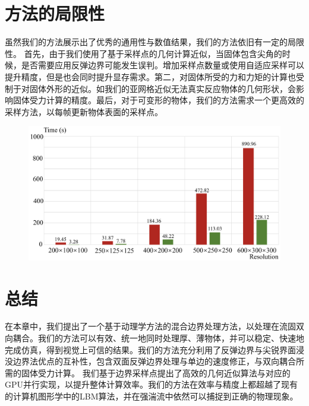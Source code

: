 \section{方法的局限性}
虽然我们的方法展示出了优秀的通用性与数值结果，我们的方法依旧有一定的局限性。
首先，由于我们使用了基于采样点的几何计算近似，当固体包含尖角的时候，是否需要应用反弹边界可能发生误判。增加采样点数量或使用自适应采样可以提升精度，但是也会同时提升显存需求。第二，对固体所受的力和力矩的计算也受制于对固体外形的近似。如我们的亚网格近似无法真实反应物体的几何形状，会影响固体受力计算的精度。最后，对于可变形的物体，我们的方法需求一个更高效的采样方法，以每帧更新物体表面的采样点。

\begin{figure}[!tbp]
  \centering
    \includegraphics[width=0.93\columnwidth]{figures/performance.png}
  \label{img:Performance}
\end{figure}

\section{总结}
在本章中，我们提出了一个基于动理学方法的混合边界处理方法，以处理在流固双向耦合。我们的方法可以有效、统一地同时处理厚、薄物体，并可以稳定、快速地完成仿真，得到视觉上可信的结果。我们的方法充分利用了反弹边界与尖锐界面浸没边界法优点的互补性，包含双面反弹边界处理与单边的速度修正，与双向耦合所需的固体受力计算。
我们基于边界采样点提出了高效的几何近似算法与对应的GPU并行实现，以提升整体计算效率。我们的方法在效率与精度上都超越了现有的计算机图形学中的LBM算法，并在强湍流中依然可以捕捉到正确的物理现象。
